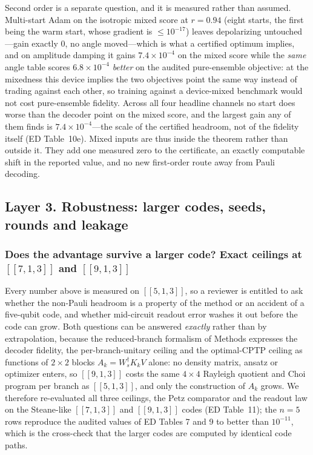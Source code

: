 \documentclass[aps,prxquantum,reprint,superscriptaddress]{revtex4-2}
\begin{document}
Second order is a separate question, and it is measured rather than assumed.
Multi-start Adam on the isotropic mixed score at $r=0.94$ (eight starts, the first
being the warm start, whose gradient is $\le10^{-17}$) leaves depolarizing
untouched---gain exactly $0$, no angle moved---which is what a certified optimum
implies, and on amplitude damping it gains $7.4\times10^{-4}$ on the mixed score
while the \emph{same} angle table scores $6.8\times10^{-4}$ \emph{better} on the
audited pure-ensemble objective: at the mixedness this device implies the two
objectives point the same way instead of trading against each other, so training
against a device-mixed benchmark would not cost pure-ensemble fidelity. Across all
four headline channels no start does worse than the decoder point on the mixed
score, and the largest gain any of them finds is $7.4\times10^{-4}$---the scale of
the certified headroom, not of the fidelity itself (ED Table~10e). Mixed inputs are
thus inside the theorem rather than outside it. They add one measured zero to the
certificate, an exactly computable shift in the reported value, and no new
first-order route away from Pauli decoding.

\subsection*{Layer 3. Robustness: larger codes, seeds, rounds and leakage}

\subsubsection*{Does the advantage survive a larger code? Exact ceilings at
$[\![7,1,3]\!]$ and $[\![9,1,3]\!]$}

Every number above is measured on $[\![5,1,3]\!]$, so a reviewer is entitled to
ask whether the non-Pauli headroom is a property of the method or an accident of
a five-qubit code, and whether mid-circuit readout error washes it out before the
code can grow. Both questions can be answered \emph{exactly} rather than by
extrapolation, because the reduced-branch formalism of Methods expresses the
decoder fidelity, the per-branch-unitary ceiling and the optimal-CPTP ceiling as
functions of $2\times2$ blocks $A_k=W_s^\dagger K_kV$ alone: no density matrix,
ansatz or optimizer enters, so $[\![9,1,3]\!]$ costs the same $4\times4$ Rayleigh
quotient and Choi program per branch as $[\![5,1,3]\!]$, and only the
construction of $A_k$ grows. We therefore re-evaluated all three ceilings, the
Petz comparator and the readout law on the Steane-like $[\![7,1,3]\!]$ and
$[\![9,1,3]\!]$ codes (ED Table~11); the $n=5$ rows reproduce the audited values
of ED Tables 7 and 9 to better than $10^{-11}$, which is the cross-check that the
larger codes are computed by identical code paths.
\end{document}
